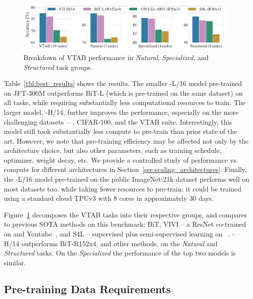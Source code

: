 \begin{figure}[]
\begin{center}
\includegraphics[width=0.98\textwidth]{images/vit-vtab.pdf}
\end{center}
\caption{Breakdown of VTAB performance in \textit{Natural}, \textit{Specialized}, and \textit{Structured} task groups. 
}
\label{fig:vtab}
\vspace{-3mm}
\end{figure}


Table~\ref{tbl:best_results} shows the results.
The smaller \oursabbrv-L/16 model pre-trained on JFT-300M outperforms BiT-L (which is pre-trained on the same dataset) on all tasks, while requiring substantially less computational resources to train.
The larger model, \oursabbrv-H/14, further improves the performance, especially on the more challenging datasets~-- \imagenet, CIFAR-100, and the VTAB suite.
Interestingly, this model still took substantially less compute to pre-train than prior state of the art. However, we note that pre-training efficiency may be affected not only by the architecture choice, but also other parameters, such as training schedule, optimizer, weight decay, etc.
We provide a controlled study of performance vs. compute for different architectures in Section~\ref{sec:scaling_architectures}.
Finally, the \oursabbrv-L/16 model pre-trained on the public ImageNet-21k dataset performs well on most datasets too, while taking fewer resources to pre-train: it could be trained using a standard cloud TPUv3 with 8 cores in approximately 30 days.

Figure~\ref{fig:vtab} decomposes the VTAB tasks into their respective groups, and compares to previous SOTA methods on this benchmark:
BiT,
VIVI -- a ResNet co-trained on \imagenet and Youtube~\citep{vivi},
and S4L -- supervised plus semi-supervised learning on \imagenet~\citep{zhai2019s4l}.
\oursabbrv{}-H/14 outperforms BiT-R152x4, and other methods, on the \textit{Natural} and \textit{Structured} tasks.
On the \textit{Specialized} the performance of the top two models is similar.

\subsection{Pre-training Data Requirements}
\label{sec:data_efficiency}

